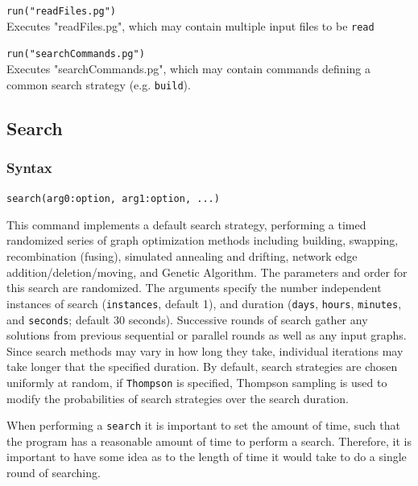 	\begin{example}
		\item{\texttt{run("readFiles.pg")}\\ Executes "readFiles.pg", which may contain multiple input 
		files to be \texttt{read}}
		
		\item{\texttt{run("searchCommands.pg")}\\ Executes "searchCommands.pg", which may 
		contain commands defining a common search strategy (e.g. \texttt{build}).}
	\end{example}

\subsection{Search}
	\subsubsection{Syntax}
		\texttt{search(arg0:option, arg1:option, ...)}
	
	\begin{phygdescription}
		{This command implements a default search strategy, performing a timed randomized 
		series of graph optimization methods including building, swapping, recombination (fusing), 
		simulated annealing and drifting, network edge addition/deletion/moving, and Genetic 
		Algorithm. The parameters and order for this search are randomized. The arguments 
		specify the number independent instances of search (\texttt{instances}, default 1), and duration 
		(\texttt{days}, \texttt{hours}, \texttt{minutes}, and \texttt{seconds}; 
		default 30 seconds). Successive rounds of search gather 
		any solutions from previous sequential or parallel rounds as well as any input graphs.
		Since search methods may vary in how long they take, individual iterations may take 
		longer that the specified duration.  By default, search strategies are chosen uniformly at random, 
		if \texttt{Thompson} is specified, Thompson sampling \cite{Thompson1933,WheelerThompson} is used to modify 
		the probabilities of search strategies over the search duration.
		
		When performing a \texttt{search} it is important to set the amount of time, such that the 
		program has a reasonable amount of time to perform a search. Therefore, it is important
		to have some idea as to the length of time it would take to do a single round of searching.}
	\end{phygdescription}
			
